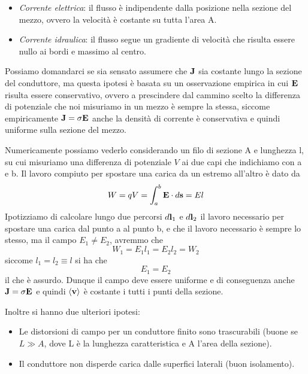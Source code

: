 \begin{itemize}
	\item \textit{Corrente elettrica}: il flusso \`e indipendente dalla posizione nella sezione del mezzo, ovvero la velocit\`a \`e costante su tutta l'area A.
	\item \textit{Corrente idraulica}: il flusso segue un gradiente di velocit\`a che risulta essere nullo ai bordi e massimo al centro.
\end{itemize}
Possiamo domandarci se sia sensato assumere  che $\bold{J} $ sia costante lungo la sezione del conduttore, ma questa ipotesi \`e basata su un osservazione empirica in cui $\bold{E}$ risulta essere conservativo, ovvero a prescindere dal cammino scelto la differenza di potenziale che noi misuriamo in un mezzo \`e sempre la stessa, siccome empiricamente $\bold{J} = \sigma \bold{E}$ anche la densit\`a di corrente \`e conservativa e quindi uniforme sulla sezione del mezzo.
\newline

Numericamente possiamo vederlo considerando un filo di sezione A e lunghezza l, su cui misuriamo una differenza di potenziale $V$ ai due capi che indichiamo con a e b. Il lavoro compiuto per spostare una carica da un estremo all'altro \`e dato da
\begin{equation*}
	W = q V = \int_{a}^{b} \bold{E} \cdot d\bold{s} = El
\end{equation*}
Ipotizziamo  di calcolare lungo due percorsi $d\bold{l}_{1}$ e $d\bold{l}_{2}$ il lavoro necessario per spostare una carica dal punto a al punto b, e che il lavoro necessario \`e sempre lo stesso, ma il campo $E_1 \neq E_{2}$, avremmo che 
\begin{equation*}
	W_{1} =E_{1}l_{1} = E_{2}l_{2} = W_{2}
\end{equation*}
siccome $l_{1} = l_{2} \equiv l$ si ha che 
\begin{equation*}
	E_{1} = E_{2}
\end{equation*}
il che \`e assurdo. Dunque il campo deve essere uniforme e di conseguenza anche $\bold{J} = \sigma \bold{E}$ e quindi $\langle \bold{v} \rangle$ \`e costante i tutti  i punti della sezione.

Inoltre si hanno due ulteriori ipotesi:
\begin{itemize}
	\item Le distorsioni di campo per un conduttore finito sono trascurabili (buone se $L \gg A$, dove L \`e la lunghezza caratteristica e A l'area della sezione).
	\item Il conduttore non disperde carica dalle superfici laterali (buon isolamento).
\end{itemize}


